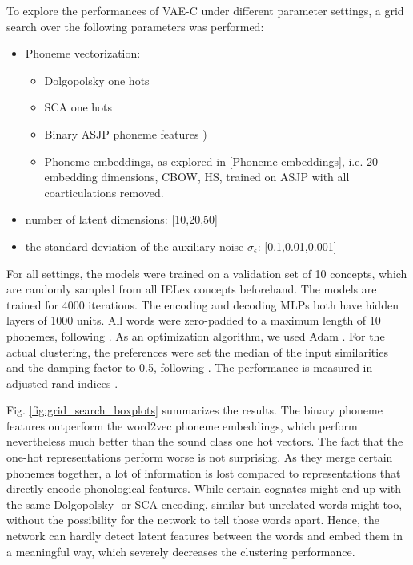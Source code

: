 \documentclass[6pt]{article}
\begin{document}
To explore the performances of VAE-C under different parameter settings, a grid search over the following parameters was performed:
\begin{itemize}
\item Phoneme vectorization:  \begin{itemize}
\item Dolgopolsky one hots \citep{dolgopolsky1986probabilistic,list2012sca}
\item SCA one hots \citep{list2012sca}
\item Binary ASJP phoneme features \citep{rama2016siamese})
\item Phoneme embeddings, as explored in \ref{Phoneme embeddings}, i.e. 20 embedding dimensions, CBOW, HS, trained on ASJP with all coarticulations removed. 
\end{itemize}
\item number of latent dimensions:  [10,20,50]
\item the standard deviation of the auxiliary noise $\sigma_{\epsilon}$: [0.1,0.01,0.001]
\end{itemize}
For all settings, the models were trained on a validation set of 10 concepts, which are randomly sampled from all IELex concepts beforehand. The models are trained for 4000 iterations. The encoding and decoding MLPs both have hidden layers of 1000 units. All words were zero-padded to a maximum length of 10 phonemes, following \cite{rama2016siamese}. As an optimization algorithm, we used Adam \citep{kingma2014adam}. For the actual clustering, the preferences were set the median of the input similarities and the damping factor to 0.5, following \cite[p. 972]{frey2007clustering}. The performance is measured in adjusted rand indices \citep{rand1971objective,hubert1985comparing}. 

Fig. \ref{fig:grid_search_boxplots} summarizes the results. The binary phoneme features outperform the word2vec phoneme embeddings, which perform nevertheless much better than the sound class one hot vectors. The fact that the one-hot representations perform worse is not surprising. As they merge certain phonemes together, a lot of information is lost compared to representations that directly encode phonological features. While certain cognates might end up with the same Dolgopolsky- or SCA-encoding, similar but unrelated words might too, without the possibility for the network to tell those words apart. Hence, the network can hardly detect latent features between the words and embed them in a meaningful way, which severely decreases the clustering performance.
\end{document}
